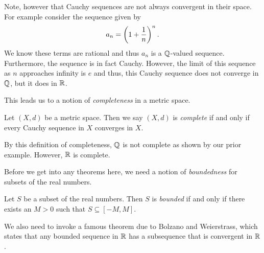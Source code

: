 \documentclass[notitlepage]{simple}
\begin{document}
Note, however that Cauchy sequences are not always convergent in their space.
For example consider the sequence given by
\[
	a_n = \left( 1+\frac{1}{n} \right)^n.
\]
We know these terms are rational and thus $a_n$ is a $\mathbb{Q}$-valued sequence.
Furthermore, the sequence is in fact Cauchy.
However, the limit of this sequence as $n$ approaches infinity is $e$ and thus, this Cauchy sequence does not converge in $\mathbb{Q}$, but it does in $\mathbb{R}$.

This leads us to a notion of \textit{completeness} in a metric space.

\begin{definition}
	Let $(X,d)$ be a metric space.
	Then we say $(X,d)$ is \textit{complete} if and only if every Cauchy sequence in $X$ converges in $X$.
\end{definition}
By this definition of completeness, $\mathbb{Q}$ is not complete as shown by our prior example.
However, $\mathbb{R}$ is complete.

Before we get into any theorems here, we need a notion of \textit{boundedness} for subsets of the real numbers.

\begin{definition}[Bounded]
	Let $S$ be a subset of the real numbers.
	Then $S$ is \textit{bounded} if and only if there exists an $M>0$ such that $S\subseteq [-M,M]$.
\end{definition}

We also need to invoke a famous theorem due to Bolzano and Weierstrass, which states that any bounded sequence in $\mathbb{R}$ has a subsequence that is convergent in $\mathbb{R}$.
\end{document}
